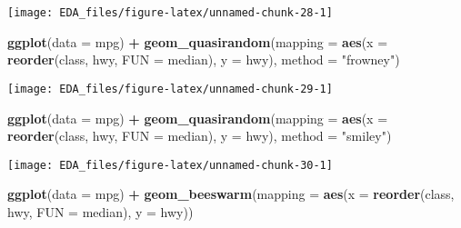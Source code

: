 \documentclass[]{book}
\newenvironment{Shaded}{\begin{snugshade}}{\end{snugshade}}
\newcommand{\DataTypeTok}[1]{\textcolor[rgb]{0.13,0.29,0.53}{#1}}
\newcommand{\KeywordTok}[1]{\textcolor[rgb]{0.13,0.29,0.53}{\textbf{#1}}}
\newcommand{\NormalTok}[1]{#1}
\newcommand{\OperatorTok}[1]{\textcolor[rgb]{0.81,0.36,0.00}{\textbf{#1}}}
\newcommand{\StringTok}[1]{\textcolor[rgb]{0.31,0.60,0.02}{#1}}
\theoremstyle{plain}
\theoremstyle{remark}
\begin{document}
\begin{center}\texttt{[image: EDA\_files/figure-latex/unnamed-chunk-28-1]} \end{center}

\begin{Shaded}
\begin{Highlighting}[]
\KeywordTok{ggplot}\NormalTok{(}\DataTypeTok{data =}\NormalTok{ mpg) }\OperatorTok{+}
\StringTok{  }\KeywordTok{geom_quasirandom}\NormalTok{(}\DataTypeTok{mapping =} \KeywordTok{aes}\NormalTok{(}\DataTypeTok{x =} \KeywordTok{reorder}\NormalTok{(class, hwy, }\DataTypeTok{FUN =}\NormalTok{ median),}
                                 \DataTypeTok{y =}\NormalTok{ hwy),}
                   \DataTypeTok{method =} \StringTok{"frowney"}\NormalTok{)}
\end{Highlighting}
\end{Shaded}

\begin{center}\texttt{[image: EDA\_files/figure-latex/unnamed-chunk-29-1]} \end{center}

\begin{Shaded}
\begin{Highlighting}[]
\KeywordTok{ggplot}\NormalTok{(}\DataTypeTok{data =}\NormalTok{ mpg) }\OperatorTok{+}
\StringTok{  }\KeywordTok{geom_quasirandom}\NormalTok{(}\DataTypeTok{mapping =} \KeywordTok{aes}\NormalTok{(}\DataTypeTok{x =} \KeywordTok{reorder}\NormalTok{(class, hwy, }\DataTypeTok{FUN =}\NormalTok{ median),}
                                 \DataTypeTok{y =}\NormalTok{ hwy),}
                   \DataTypeTok{method =} \StringTok{"smiley"}\NormalTok{)}
\end{Highlighting}
\end{Shaded}

\begin{center}\texttt{[image: EDA\_files/figure-latex/unnamed-chunk-30-1]} \end{center}

\begin{Shaded}
\begin{Highlighting}[]
\KeywordTok{ggplot}\NormalTok{(}\DataTypeTok{data =}\NormalTok{ mpg) }\OperatorTok{+}
\StringTok{  }\KeywordTok{geom_beeswarm}\NormalTok{(}\DataTypeTok{mapping =} \KeywordTok{aes}\NormalTok{(}\DataTypeTok{x =} \KeywordTok{reorder}\NormalTok{(class, hwy, }\DataTypeTok{FUN =}\NormalTok{ median),}
                                 \DataTypeTok{y =}\NormalTok{ hwy))}
\end{Highlighting}
\end{Shaded}
\end{document}
